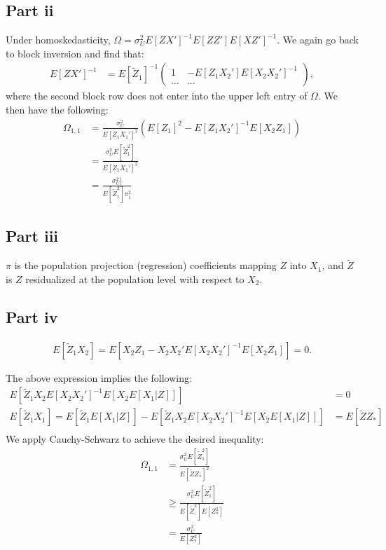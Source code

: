 \documentclass[11pt]{article} %
\begin{document}
\subsection{Part ii}
Under homoskedasticity, $\Omega = \sigma_{U}^2E[ZX']^{-1}E[ZZ']E[XZ']^{-1}$. We again go back to block inversion and find that:
\begin{align*}
E[ZX']^{-1} &= E[\tilde{Z}_1]^{-1}\begin{pmatrix} 1 & -E[Z_1X_2']E[X_2X_2']^{-1} \\ \dots & \dots \end{pmatrix},
\end{align*}
where the second block row does not enter into the upper left entry of $\Omega$. We then have the following:
\begin{align*}
\Omega_{1,1} &= \frac{ \sigma_{U}^2}{E[Z_1X_1']^2} (E[Z_1]^2 - E[Z_1X_2']^{-1}E[X_2Z_1])\\
&= \frac{\sigma_{U}^2E[\tilde{Z}^2_1]}{E[Z_1X_1']^2}\\
&= \frac{\sigma_{U}^2]}{E[\tilde{Z}_1^2]\pi_1^2}
\end{align*}
\subsection{Part iii}
$\pi$ is the population projection (regression) coefficients mapping $Z$ into $X_1$, and $\tilde{Z}$ is $Z$ residualized at the population level with respect to $X_2$.
\subsection{Part iv}
\begin{align*}
E[\tilde{Z}_1X_2] =  E[X_2Z_1 - X_2X_2'E[X_2X_2']^{-1}E[X_2Z_1]] = 0.
\end{align*}

The above expression implies the following:
\begin{align*}
E[\tilde{Z}_1X_2E[X_2X_2']^{-1}E[X_2E[X_1|Z]]] &= 0\\
E[\tilde{Z}_1X_1] = E[\tilde{Z}_1E[X_1|Z]] - E[\tilde{Z}_1X_2E[X_2X_2']^{-1}E[X_2E[X_1|Z]]] &= E[\tilde{Z}Z_{*}]\\ 
\end{align*}
We apply Cauchy-Schwarz to achieve the desired inequality:
\begin{align*}
\Omega_{1,1} &= \frac{\sigma^2_UE[\tilde{Z}^2_1]}{E[\tilde{Z}Z_{*}]^2} \\
&\geq \frac{\sigma^2_UE[\tilde{Z}^2_1]}{E[\tilde{Z}^2]E[Z_{*}^2]}\\
&=    \frac{\sigma^2_U}{E[Z_{*}^2]}
\end{align*}
\end{document}
